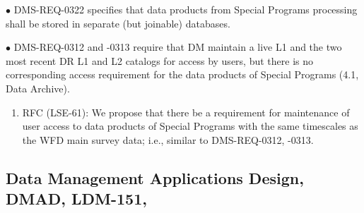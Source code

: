 \documentclass[DM,lsstdraft,toc]{lsstdoc}
\begin{document}
$\bullet$ DMS-REQ-0322 specifies that data products from Special Programs processing shall be stored in separate (but joinable) databases.

$\bullet$ DMS-REQ-0312 and -0313 require that DM maintain a live L1 and the two most recent DR L1 and L2 catalogs for access by users, but there is no corresponding access requirement for the data products of Special Programs (4.1, Data Archive).
\begin{enumerate}[resume,topsep=-10pt,after=\vspace{10pt},label= \textbf{Action \Roman*}] \item \label{DMSR-7} RFC (LSE-61): We propose that there be a requirement for maintenance of user access to data products of Special Programs with the same timescales as the WFD main survey data; i.e., similar to DMS-REQ-0312, -0313. \end{enumerate}





\subsection{Data Management Applications Design, DMAD, LDM-151, \cite{LDM-151}}\label{ssec:docrev_dmad}
\end{document}
